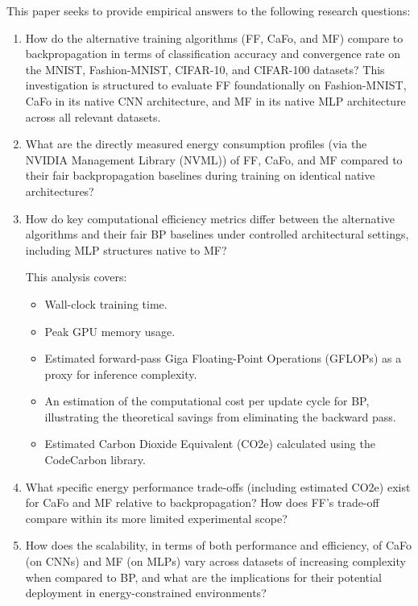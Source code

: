 This paper seeks to provide empirical answers to the following research questions:
\begin{enumerate}
    \item How do the alternative training algorithms (FF, CaFo, and MF) compare to backpropagation in terms of classification accuracy and convergence rate on the MNIST, Fashion-MNIST, CIFAR-10, and CIFAR-100 datasets? This investigation is structured to evaluate FF foundationally on Fashion-MNIST, CaFo in its native CNN architecture, and MF in its native MLP architecture across all relevant datasets.

    \item What are the directly measured energy consumption profiles (via the NVIDIA Management Library (NVML)) of FF, CaFo, and MF compared to their fair backpropagation baselines during training on identical native architectures?

    \item How do key computational efficiency metrics differ between the alternative algorithms and their fair BP baselines under controlled architectural settings, including MLP structures native to MF?
    
    This analysis covers:
        \begin{itemize}
            \item Wall-clock training time.
            \item Peak GPU memory usage.
            \item Estimated forward-pass Giga Floating-Point Operations (GFLOPs) as a proxy for inference complexity.
            \item An estimation of the computational cost per update cycle for BP, illustrating the theoretical savings from eliminating the backward pass.
            \item Estimated Carbon Dioxide Equivalent (CO2e) calculated using the CodeCarbon library.
        \end{itemize}

    \item What specific energy performance trade-offs (including estimated CO2e) exist for CaFo and MF relative to backpropagation? How does FF's trade-off compare within its more limited experimental scope?
    
    \item How does the scalability, in terms of both performance and efficiency, of CaFo (on CNNs) and MF (on MLPs) vary across datasets of increasing complexity when compared to BP, and what are the implications for their potential deployment in energy-constrained environments?
\end{enumerate}

